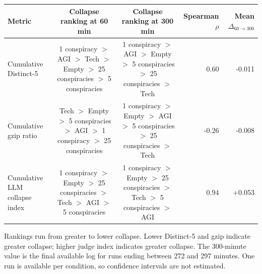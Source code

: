 \documentclass[border=10pt]{standalone}
\begin{document}
\begin{minipage}{10.6in}
\centering
\scriptsize
\setlength{\tabcolsep}{5pt}
\begin{tabular}{lccrr}
\toprule
Metric & Collapse ranking at 60 min & Collapse ranking at 300 min & Spearman $\rho$ & Mean $\Delta_{60\rightarrow300}$ \\
\midrule
Cumulative Distinct-5 & 1 conspiracy $>$ AGI $>$ Tech $>$ Empty $>$ 25 conspiracies $>$ 5 conspiracies & 1 conspiracy $>$ AGI $>$ Empty $>$ 5 conspiracies $>$ 25 conspiracies $>$ Tech & 0.60 & -0.011 \\
Cumulative gzip ratio & Tech $>$ Empty $>$ 5 conspiracies $>$ AGI $>$ 1 conspiracy $>$ 25 conspiracies & 1 conspiracy $>$ Empty $>$ AGI $>$ 5 conspiracies $>$ 25 conspiracies $>$ Tech & -0.26 & -0.008 \\
Cumulative LLM collapse index & 1 conspiracy $>$ Empty $>$ 25 conspiracies $>$ Tech $>$ AGI $>$ 5 conspiracies & 1 conspiracy $>$ Empty $>$ 25 conspiracies $>$ Tech $>$ 5 conspiracies $>$ AGI & 0.94 & +0.053 \\
\bottomrule
\end{tabular}
\vspace{5pt}
\parbox{10.3in}{\scriptsize Rankings run from greater to lower collapse. Lower Distinct-5 and gzip indicate greater collapse; higher judge index indicates greater collapse. The 300-minute value is the final available log for runs ending between 272 and 297 minutes. One run is available per condition, so confidence intervals are not estimated.}
\end{minipage}
\end{document}
